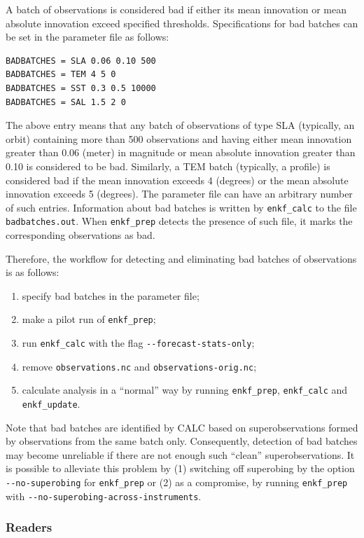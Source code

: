 \documentclass[11pt]{report}
\begin{document}
A batch of observations is considered bad if either its mean innovation or mean absolute innovation exceed specified thresholds.
Specifications for bad batches can be set in the parameter file as follows:
\begin{Verbatim}[frame=single,fontsize=\footnotesize]
BADBATCHES = SLA 0.06 0.10 500
BADBATCHES = TEM 4 5 0
BADBATCHES = SST 0.3 0.5 10000
BADBATCHES = SAL 1.5 2 0
\end{Verbatim}
The above entry means that any batch of observations of type SLA (typically, an orbit) containing more than 500 observations and having either mean innovation greater than 0.06 (meter) in magnitude or mean absolute innovation greater than 0.10 is considered to be bad.
Similarly, a TEM batch (typically, a profile) is considered bad if the mean innovation exceeds 4 (degrees) or the mean absolute innovation exceeds 5 (degrees).
The parameter file can have an arbitrary number of such entries.
Information about bad batches is written by \verb|enkf_calc| to the file \verb|badbatches.out|.
When \verb|enkf_prep| detects the presence of such file, it marks the corresponding observations as bad.

Therefore, the workflow for detecting and eliminating bad batches of observations is as follows:
\begin{enumerate}
\item specify bad batches in the parameter file;
\item make a pilot run of \verb|enkf_prep|;
\item run \verb|enkf_calc| with the flag \verb|--forecast-stats-only|;
\item remove \verb|observations.nc| and \verb|observations-orig.nc|;
\item calculate analysis in a ``normal'' way by running \verb|enkf_prep|, \verb|enkf_calc| and \verb|enkf_update|.
\end{enumerate}

Note that bad batches are identified by CALC based on superobservations formed by observations from the same batch only.
Consequently, detection of bad batches may become unreliable if there are not enough such ``clean'' superobservations.
It is possible to alleviate this problem by (1) switching off superobing by the option \verb|--no-superobing| for \verb|enkf_prep| or (2) as a compromise, by running \verb|enkf_prep| with \verb|--no-superobing-across-instruments|.

\subsubsection{Readers}
\end{document}
